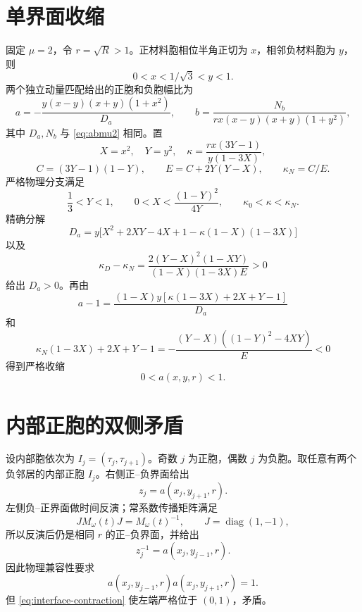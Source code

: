 \documentclass[UTF8,12pt,openany,fontset=fandol]{ctexrep}
\theoremstyle{definition}
\newcommand{\diag}{\operatorname{diag}}
\begin{document}
\section{单界面收缩}

固定 $\mu=2$，令 $r=\sqrt R>1$。正材料胞相位半角正切为 $x$，相邻负材料胞为 $y$，则
\begin{equation}
 0<x<1/\sqrt3<y<1.
\end{equation}
两个独立动量匹配给出的正胞和负胞幅比为
\begin{equation}
 a=-\frac{y(x-y)(x+y)(1+x^2)}{D_a},\qquad
 b=\frac{N_b}{rx(x-y)(x+y)(1+y^2)},
\end{equation}
其中 $D_a,N_b$ 与 \eqref{eq:abmu2} 相同。置
\begin{equation}
 X=x^2,\quad Y=y^2,\quad
 \kappa=\frac{rx(3Y-1)}{y(1-3X)},
\end{equation}
\begin{equation}
 C=(3Y-1)(1-Y),\qquad E=C+2Y(Y-X),\qquad \kappa_N=C/E.
\end{equation}
严格物理分支满足
\begin{equation}
 \frac13<Y<1,\qquad 0<X<\frac{(1-Y)^2}{4Y},\qquad
 \kappa_0<\kappa<\kappa_N.
\end{equation}
精确分解
\begin{equation}
 D_a=y\bigl[X^2+2XY-4X+1-\kappa(1-X)(1-3X)\bigr]
\end{equation}
以及
\begin{equation}
 \kappa_D-\kappa_N=
 \frac{2(Y-X)^2(1-XY)}{(1-X)(1-3X)E}>0
\end{equation}
给出 $D_a>0$。再由
\begin{equation}
 a-1=\frac{(1-X)y[\kappa(1-3X)+2X+Y-1]}{D_a}
\end{equation}
和
\begin{equation}
 \kappa_N(1-3X)+2X+Y-1
 =-\frac{(Y-X)((1-Y)^2-4XY)}E<0
\end{equation}
得到严格收缩
\begin{equation}\label{eq:interface-contraction}
 0<a(x,y,r)<1.
\end{equation}

\section{内部正胞的双侧矛盾}

设内部胞依次为 $I_j=(\tau_j,\tau_{j+1})$。奇数 $j$ 为正胞，偶数 $j$ 为负胞。取任意有两个负邻居的内部正胞 $I_j$。右侧正--负界面给出
\begin{equation}
 z_j=a(x_j,y_{j+1},r).
\end{equation}
左侧负--正界面做时间反演；常系数传播矩阵满足
\begin{equation}
 J M_\omega(t)J=M_\omega(t)^{-1},\qquad J=\diag(1,-1),
\end{equation}
所以反演后仍是相同 $r$ 的正--负界面，并给出
\begin{equation}
 z_j^{-1}=a(x_j,y_{j-1},r).
\end{equation}
因此物理兼容性要求
\begin{equation}
 a(x_j,y_{j-1},r)a(x_j,y_{j+1},r)=1.
\end{equation}
但 \eqref{eq:interface-contraction} 使左端严格位于 $(0,1)$，矛盾。
\end{document}
